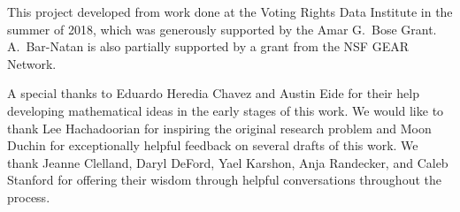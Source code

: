 
This project developed from work done at the Voting Rights Data Institute in the summer of 2018, which was generously supported by the Amar G.\ Bose Grant.  A.\ Bar-Natan is also partially supported by a grant from the NSF GEAR Network.

A special thanks to Eduardo Heredia Chavez and Austin Eide for their help developing mathematical ideas in the early stages of this work. We would like to thank Lee Hachadoorian for inspiring the original research problem and Moon Duchin for exceptionally helpful feedback on several drafts of this work.  We thank Jeanne Clelland, Daryl DeFord, Yael Karshon, Anja Randecker, and Caleb Stanford for offering their wisdom through helpful conversations throughout the process.